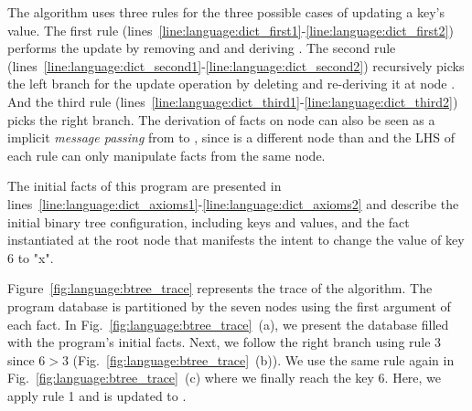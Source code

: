 The algorithm uses three rules for the three possible cases of updating a key's
value. The first rule
(lines~\ref{line:language:dict_first1}-\ref{line:language:dict_first2}) performs
the update by removing  and  and
deriving . The second rule
(lines~\ref{line:language:dict_second1}-\ref{line:language:dict_second2})
recursively picks the left branch for the update operation by deleting
 and re-deriving it at node . And the
third rule
(lines~\ref{line:language:dict_third1}-\ref{line:language:dict_third2}) picks
the right branch. The derivation of  facts on node  can
also be seen as a implicit \emph{message passing} from  to ,
since  is a different node than  and the LHS of each rule can
only manipulate facts from the same node.

The initial facts of this program are presented in
lines~\ref{line:language:dict_axioms1}-\ref{line:language:dict_axioms2} and
describe the initial binary tree configuration, including keys and values, and
the  fact instantiated at the root node  that
manifests the intent to change the value of key 6 to "x".

Figure~\ref{fig:language:btree_trace} represents the trace of the algorithm. The program
database is partitioned by the seven nodes using the first argument of each
fact. In Fig.~\ref{fig:language:btree_trace}~(a), we present the database filled with the
program's initial facts. Next, we follow the right branch using rule 3 since $6
> 3$ (Fig.~\ref{fig:language:btree_trace}~(b)).  We use the same rule again in
Fig.~\ref{fig:language:btree_trace}~(c) where we finally reach the key 6. Here, we apply
rule 1 and  is updated to .

